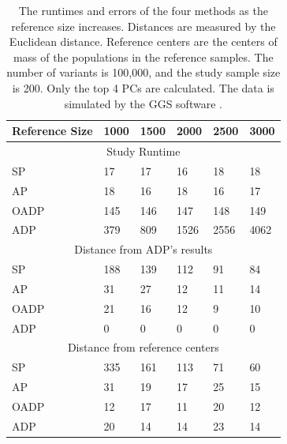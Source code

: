 \documentclass{article}
\begin{document}
\begin{table}[h]
  \centering
  \begin{tabular}{|l|l|l|l|l|l|}
    \hline
    Reference Size & 1000 & 1500 & 2000 & 2500 & 3000 \\
    \hline
    \multicolumn{6}{|c|}{Study Runtime} \\
    \hline
    SP         &  17  & 17   & 16   & 18   & 18   \\
    AP         &  18  & 16   & 18  & 16   & 17  \\
    OADP       &  145  & 146   & 147   & 148   & 149   \\
    ADP        &  379  & 809 & 1526 & 2556 & 4062 \\
    \hline
    \multicolumn{6}{|c|}{Distance from ADP's results} \\
    \hline
    SP         &  188  & 139   & 112   & 91   & 84   \\
    AP         &  31  & 27   & 12  & 11   & 14  \\
    OADP       &  21  & 16   & 12   & 9   & 10   \\
    ADP        &  0  & 0 & 0 & 0 & 0 \\
    \hline
    \multicolumn{6}{|c|}{Distance from reference centers} \\
    \hline
    SP         &  335 & 161  & 113 & 71  & 60  \\
    AP         &  31  & 19   & 17  & 25  & 15  \\
    OADP       &  12  & 17   & 11  & 20  & 12  \\
    ADP        &  20  & 14   & 14  & 23  & 14  \\
    \hline
  \end{tabular}
  \caption{
    The runtimes and errors of the four methods
    as the reference size increases.
    Distances are measured by the Euclidean distance.
    Reference centers are the centers of mass of the populations
    in the reference samples.
    The number of variants is 100,000,
    and the study sample size is 200.
    Only the top 4 PCs are calculated.
    The data is simulated by the GGS software \citep{mathieson2012differential}.
    }
\end{table}
\end{document}
